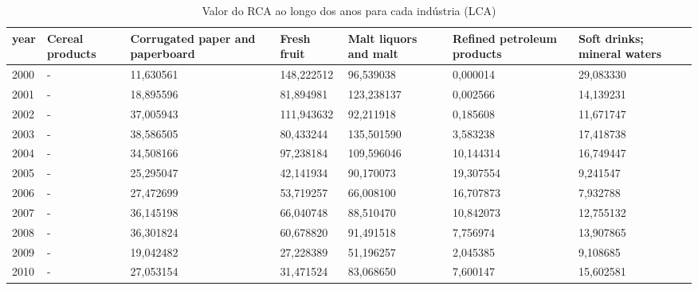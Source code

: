 \begin{table}
\centering
\caption{Valor do RCA ao longo dos anos para cada indústria (LCA)}
\begin{tabular}{p{1cm}p{2cm}p{2cm}p{2cm}p{2cm}p{2cm}p{2cm}}
\toprule
 year &  Cereal products &  Corrugated paper and paperboard &  Fresh fruit &  Malt liquors and malt &  Refined petroleum products &  Soft drinks; mineral waters \\
\midrule
 2000 &                - &                        11,630561 &   148,222512 &              96,539038 &                    0,000014 &                    29,083330 \\
 2001 &                - &                        18,895596 &    81,894981 &             123,238137 &                    0,002566 &                    14,139231 \\
 2002 &                - &                        37,005943 &   111,943632 &              92,211918 &                    0,185608 &                    11,671747 \\
 2003 &                - &                        38,586505 &    80,433244 &             135,501590 &                    3,583238 &                    17,418738 \\
 2004 &                - &                        34,508166 &    97,238184 &             109,596046 &                   10,144314 &                    16,749447 \\
 2005 &                - &                        25,295047 &    42,141934 &              90,170073 &                   19,307554 &                     9,241547 \\
 2006 &                - &                        27,472699 &    53,719257 &              66,008100 &                   16,707873 &                     7,932788 \\
 2007 &                - &                        36,145198 &    66,040748 &              88,510470 &                   10,842073 &                    12,755132 \\
 2008 &                - &                        36,301824 &    60,678820 &              91,491518 &                    7,756974 &                    13,907865 \\
 2009 &                - &                        19,042482 &    27,228389 &              51,196257 &                    2,045385 &                     9,108685 \\
 2010 &                - &                        27,053154 &    31,471524 &              83,068650 &                    7,600147 &                    15,602581 \\

\end{tabular}
\end{table}
